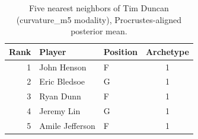 \begin{table}[htbp]
  \centering\small
  \begin{tabular}{rllc}
    \toprule
    Rank & Player & Position & Archetype \\
    \midrule
    1 & John Henson & F & 1 \\
    2 & Eric Bledsoe & G & 1 \\
    3 & Ryan Dunn & F & 1 \\
    4 & Jeremy Lin & G & 1 \\
    5 & Amile Jefferson & F & 1 \\
    \bottomrule
  \end{tabular}
  \caption{Five nearest neighbors of Tim Duncan (curvature_m5 modality), Procrustes-aligned posterior mean.}
  \label{tab:Tim_Duncan_neighbors_curvature_m5}
\end{table}

